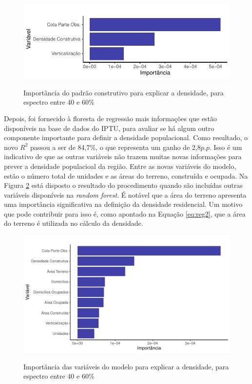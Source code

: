 \begin{figure}[h]
    \centering
    \caption{Importância do padrão construtivo para explicar a densidade, para espectro entre 40 e 60\%}
    \includegraphics[width = .8\linewidth]{imagens/var_importance_restrito.pdf}
    \label{fig:importancia-restrito}
\end{figure}

Depois, foi fornecido à floresta de regressão mais informações que estão disponíveis na base de dados do IPTU, para avaliar se há algum outro componente importante para definir a densidade populacional. Como resultado, o novo $R^2$ passou a ser de 84,7\%, o que representa um ganho de 2,8$p.p.$ Isso é um indicativo de que as outras variáveis não trazem muitas novas informações para prever a densidade populacioal da região. Entre as novas variáveis do modelo, estão o número total de unidades e as áreas do terreno, construída e ocupada. Na Figura \ref{fig:importancia} está disposto o resultado do procedimento quando são incluídas outras variáveis disponíveis na \textit{random forest}. É notável que a área do terreno apresenta uma importância significativa na definição da densidade residencial. Um motivo que pode contribuir para isso é, como apontado na Equação \ref{eq:reg2}, que a área do terreno é utilizada no cálculo da densidade.

\begin{figure}[h]
    \centering
    \caption{Importância das variáveis do modelo para explicar a densidade, para espectro entre 40 e 60\%}
    \includegraphics[width = .95\linewidth]{imagens/var_importance.pdf}
    \label{fig:importancia}
\end{figure}

